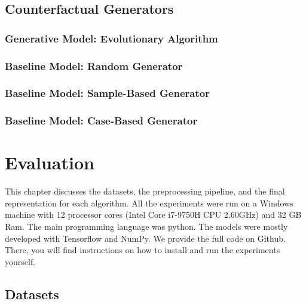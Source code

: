 \documentclass[12pt,a4paper]{report}
\begin{document}
\section{Counterfactual Generators}
\label{sec:model_generation}
\subsection{Generative Model: Evolutionary Algorithm}
\label{sec:model_evolutionary}


\subsection{Baseline Model: Random Generator}


\subsection{Baseline Model: Sample-Based Generator}


\subsection{Baseline Model: Case-Based Generator}



\chapter{Evaluation}
\label{ch:evaluation}
This chapter discusses the datasets, the preprocessing pipeline, and the final representation for each algorithm. All the experiments were run on a Windows machine with 12 processor cores (Intel Core i7-9750H CPU 2.60GHz) and 32 GB Ram. The main programming language was python. 
The models were mostly developed with Tensorflow\autocite{abadi2016tensorflow} and NumPy\autocite{2020NumPy-Array}. 
We provide the full code on Github\autocite{hundogan_ThesisProjectCode_2022}. 
There, you will find instructions on how to install and run the experiments yourself.


\section{Datasets}
\label{sec:dataset_description}


\end{document}
